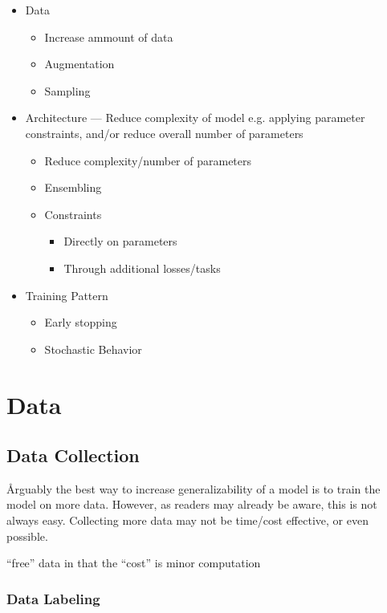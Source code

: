 \begin{itemize}[noitemsep,topsep=0pt]
	\item Data
	\begin{itemize}[noitemsep,topsep=0pt]
		\item Increase ammount of data
		\item Augmentation
		\item Sampling
	\end{itemize}
	\item Architecture --- Reduce complexity of model e.g. applying parameter constraints, and/or reduce overall number of parameters
	\begin{itemize}[noitemsep,topsep=0pt]
		\item Reduce complexity/number of parameters
		\item Ensembling
		\item Constraints
		\begin{itemize}[noitemsep,topsep=0pt]
			\item Directly on parameters
			\item Through additional losses/tasks
		\end{itemize}
	\end{itemize}
	\item Training Pattern
	\begin{itemize}[noitemsep,topsep=0pt]
		\item Early stopping
		\item Stochastic Behavior
	\end{itemize}
\end{itemize}


\section{Data}

\subsection{Data Collection}

\r{Arguably the best way to increase generalizability of a model is to train the model on more data. However, as readers may already be aware, this is not always easy. Collecting more data may not be time/cost effective, or even possible.}

\r{``free'' data in that the ``cost'' is minor computation}

\subsubsection{Data Labeling}

